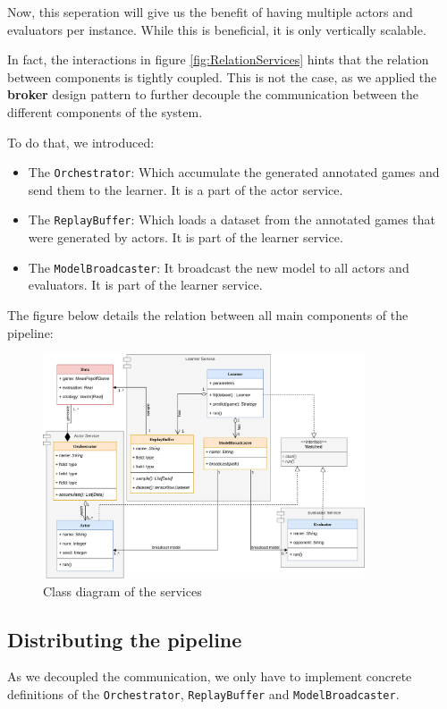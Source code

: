Now, this seperation will give us the benefit of having multiple actors and evaluators per instance. While this is beneficial, it is only vertically scalable.

In fact, the interactions in figure \ref{fig:RelationServices} hints that the relation between components is tightly coupled. This is not the case, as we applied the \textbf{broker} design pattern to further decouple the communication between the different components of the system.

To do that, we introduced:
\begin{itemize}
	\item The \texttt{Orchestrator}: Which accumulate the generated annotated games and send them to the learner. It is a part of the actor service.
	\item The \texttt{ReplayBuffer}: Which loads a dataset from the annotated games that were generated by actors. It is part of the learner service.
	\item The \texttt{ModelBroadcaster}: It broadcast the new model to all actors and evaluators. It is part of the learner service.
\end{itemize}
The figure below details the relation between all main components of the pipeline:

\begin{figure}[H]
	\centering
	\includegraphics[width=0.85\textwidth]{Figures/ServiceDiagram.png}
	\caption{Class diagram of the services}
\end{figure}
\FloatBarrier
\subsection{Distributing the pipeline}
As we decoupled the communication, we only have to implement concrete definitions of the \texttt{Orchestrator}, \texttt{ReplayBuffer} and \texttt{ModelBroadcaster}.

